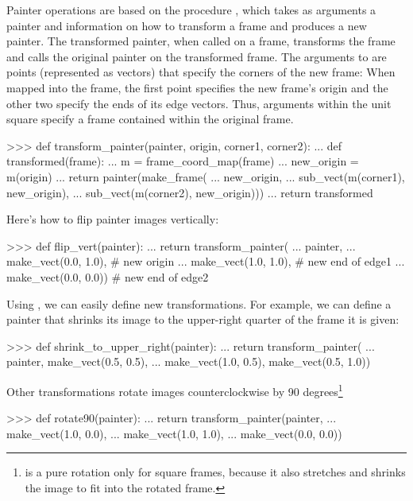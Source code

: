Painter operations are based on the procedure , which
takes as arguments a painter and information on how to transform a frame and
produces a new painter.  The transformed painter, when called on a frame,
transforms the frame and calls the original painter on the transformed frame.
The arguments to  are points (represented as vectors)
that specify the corners of the new frame: When mapped into the frame, the
first point specifies the new frame's origin and the other two specify the ends
of its edge vectors.  Thus, arguments within the unit square specify a frame
contained within the original frame.

\begin{codeBlock}
>>> def transform_painter(painter, origin, corner1, corner2):
...     def transformed(frame):
...         m = frame_coord_map(frame)
...         new_origin = m(origin)
...         return painter(make_frame(
...             new_origin,
...             sub_vect(m(corner1), new_origin),
...             sub_vect(m(corner2), new_origin)))
...     return transformed
\end{codeBlock}

\noindent
Here's how to flip painter images vertically:

\begin{codeBlock}
>>> def flip_vert(painter):
...     return transform_painter(
...         painter,
...         make_vect(0.0, 1.0),    # new origin
...         make_vect(1.0, 1.0),    # new end of edge1
...         make_vect(0.0, 0.0))    # new end of edge2
\end{codeBlock}

\noindent
Using , we can easily define new transformations.
For example, we can define a painter that shrinks its image to the
upper-right quarter of the frame it is given:

\begin{codeBlock}
>>> def shrink_to_upper_right(painter):
...     return transform_painter(
...         painter, make_vect(0.5, 0.5),
...         make_vect(1.0, 0.5), make_vect(0.5, 1.0))
\end{codeBlock}

\noindent
Other transformations rotate images counterclockwise by 90
degrees\footnote{ is a pure rotation only for square frames,
because it also stretches and shrinks the image to fit into the rotated frame.}

\begin{codeBlock}
>>> def rotate90(painter):
...     return transform_painter(painter,
...                              make_vect(1.0, 0.0),
...                              make_vect(1.0, 1.0),
...                              make_vect(0.0, 0.0))
\end{codeBlock}

